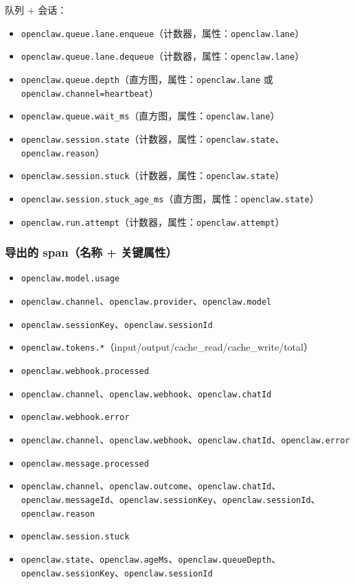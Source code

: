 队列 + 会话：

\begin{itemize}
  \item \texttt{openclaw.queue.lane.enqueue}（计数器，属性：\texttt{openclaw.lane}）
  \item \texttt{openclaw.queue.lane.dequeue}（计数器，属性：\texttt{openclaw.lane}）
  \item \texttt{openclaw.queue.depth}（直方图，属性：\texttt{openclaw.lane} 或 \texttt{openclaw.channel=heartbeat}）
  \item \texttt{openclaw.queue.wait\_ms}（直方图，属性：\texttt{openclaw.lane}）
  \item \texttt{openclaw.session.state}（计数器，属性：\texttt{openclaw.state}、\texttt{openclaw.reason}）
  \item \texttt{openclaw.session.stuck}（计数器，属性：\texttt{openclaw.state}）
  \item \texttt{openclaw.session.stuck\_age\_ms}（直方图，属性：\texttt{openclaw.state}）
  \item \texttt{openclaw.run.attempt}（计数器，属性：\texttt{openclaw.attempt}）
\end{itemize}


\subsubsection{导出的 span（名称 + 关键属性）}


\begin{itemize}
  \item \texttt{openclaw.model.usage}
  \item \texttt{openclaw.channel}、\texttt{openclaw.provider}、\texttt{openclaw.model}
  \item \texttt{openclaw.sessionKey}、\texttt{openclaw.sessionId}
  \item \texttt{openclaw.tokens.*}（input/output/cache\_read/cache\_write/total）
  \item \texttt{openclaw.webhook.processed}
  \item \texttt{openclaw.channel}、\texttt{openclaw.webhook}、\texttt{openclaw.chatId}
  \item \texttt{openclaw.webhook.error}
  \item \texttt{openclaw.channel}、\texttt{openclaw.webhook}、\texttt{openclaw.chatId}、\texttt{openclaw.error}
  \item \texttt{openclaw.message.processed}
  \item \texttt{openclaw.channel}、\texttt{openclaw.outcome}、\texttt{openclaw.chatId}、\texttt{openclaw.messageId}、\texttt{openclaw.sessionKey}、\texttt{openclaw.sessionId}、\texttt{openclaw.reason}
  \item \texttt{openclaw.session.stuck}
  \item \texttt{openclaw.state}、\texttt{openclaw.ageMs}、\texttt{openclaw.queueDepth}、\texttt{openclaw.sessionKey}、\texttt{openclaw.sessionId}
\end{itemize}


